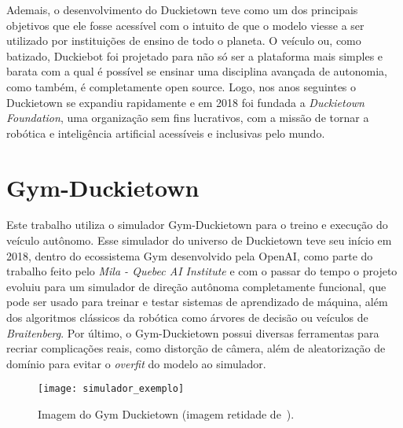 Ademais, o desenvolvimento do Duckietown teve como um dos principais objetivos que ele fosse acessível com o intuito de que o modelo viesse a ser utilizado por instituições de ensino de todo o planeta. O veículo ou, como batizado, Duckiebot foi projetado para não só ser a plataforma mais simples e barata com a qual é possível se ensinar uma disciplina avançada de autonomia, como também, é completamente open source. Logo, nos anos seguintes o Duckietown se expandiu rapidamente e em 2018 foi fundada a \emph{Duckietown Foundation}, uma organização sem fins lucrativos, com a missão de tornar a robótica e inteligência artificial acessíveis e inclusivas pelo mundo. 

\section{Gym-Duckietown}

Este trabalho utiliza o simulador Gym-Duckietown\citep{gym-duckietown} para o treino e execução do veículo autônomo. Esse simulador do universo de Duckietown teve seu início em 2018, dentro do ecossistema Gym desenvolvido pela OpenAI\citep{1606.01540}, como parte do trabalho feito pelo \textit{Mila - Quebec AI Institute} e com o passar do tempo o projeto evoluiu para um simulador de direção autônoma completamente funcional, que pode ser usado para treinar e testar sistemas de aprendizado de máquina, além dos algoritmos clássicos da robótica como árvores de decisão ou veículos de \textit{Braitenberg}. Por último, o Gym-Duckietown possui diversas ferramentas para recriar complicações reais, como distorção de câmera, além de aleatorização de domínio para evitar o \textit{overfit} do modelo ao simulador.

\begin{figure}
	\centering
	\texttt{[image: simulador\_exemplo]}
	\caption{Imagem do Gym Duckietown (imagem retidade de~\citep{gym-duckietown}).\label{fig:simulador_exemplo}}
\end{figure}


